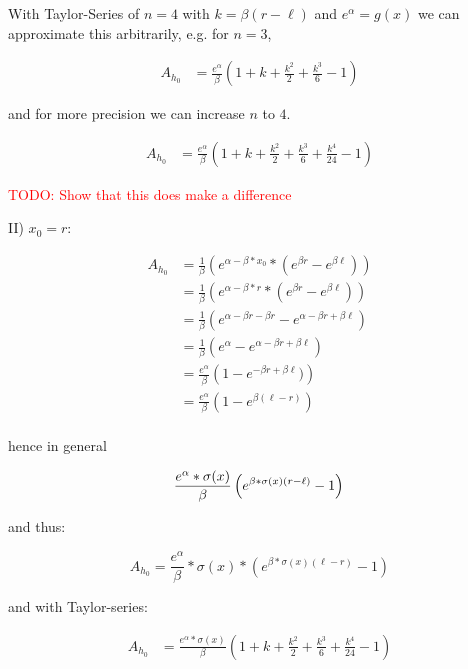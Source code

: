 With Taylor-Series of $n = 4$ with $k = \beta (r - \ell)$ and $e^{\alpha} = g(x)$ we can approximate this arbitrarily,
e.g. for $n = 3$,

\begin{align*}
	A_{h_0} &= \frac{e^{\alpha}}{\beta} \left(1 + k + \frac{k^2}{2} +  \frac{k^3}{6} - 1 \right)
\end{align*}

and for more precision we can increase $n$ to $4$.

\begin{align*}
	A_{h_0} &= \frac{e^{\alpha}}{\beta} \left(1 + k + \frac{k^2}{2} +  \frac{k^3}{6} + \frac{k^4}{24} - 1 \right)
\end{align*}

\textcolor{red}{TODO: Show that this does make a difference}

II) $x_0 = r$:

\begin{align*}
	A_{h_0} &= \frac{1}{\beta} \left( e^{\alpha - \beta * x_0} * \left(e^{\beta r} - e^{\beta \ell} \right) \right) \\
	&= \frac{1}{\beta} \left( e^{\alpha - \beta * r} * \left(e^{\beta r} - e^{\beta \ell} \right) \right) \\
	&= \frac{1}{\beta} \left(e^{\alpha - \beta r - \beta r} - e^{\alpha - \beta r + \beta \ell} \right) \\
	&= \frac{1}{\beta} \left(e^{\alpha} - e^{\alpha - \beta r + \beta \ell} \right) \\
	&= \frac{e^{\alpha}}{\beta} \left(1 - e^{- \beta r + \beta \ell} ) \right) \\
	&= \frac{e^{\alpha}}{\beta} \left(1 - e^{\beta (\ell - r)}  \right) \\
\end{align*}

hence in general

\[
	\frac{e^{\alpha} * \sigma(x)}{\beta} \left(e^{\beta * \sigma(x) (r - \ell)} - 1 \right) \\
\]

and thus:

\[
	A_{h_0} = \frac{e^{\alpha}}{\beta} * \sigma(x) * \left(e^{\beta * \sigma(x) (\ell - r)} - 1 \right)
\]

and with Taylor-series:

\begin{align*}
	A_{h_0} &= \frac{e^{\alpha} * \sigma(x)}{\beta} \left(1 + k + \frac{k^2}{2} +  \frac{k^3}{6} + \frac{k^4}{24} - 1 \right)
\end{align*}

